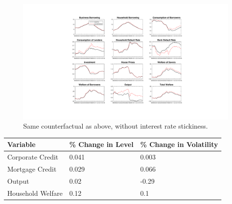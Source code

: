 \documentclass[12pt]{article}
\numberwithin{equation}{section}
\begin{document}
\begin{figure}[H]
\centering
\caption{Same counterfactual as above, without interest rate stickiness.}
\includegraphics[scale=0.45]{counterfactuals11.pdf}
\end{figure}



\begin{table}[h]
\begin{tabular}{l|l|l}
\small
Variable & \% Change in Level & \% Change in Volatility \\
\hline
\hline
    Corporate Credit           &       0.041    &     0.003 \\
    Mortgage Credit            &      0.029    &      0.066 \\
    Output         				&     0.02    &    -0.29 \\ 
    Household Welfare       &     0.12     &     0.1\\
\end{tabular}
\end{table}
\end{document}
